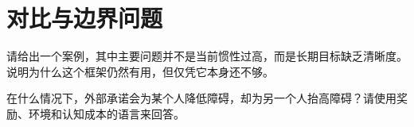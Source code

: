 \section{对比与边界问题}

\begin{exercisebox}
\begin{exercise}
请给出一个案例，其中主要问题并不是当前惯性过高，而是长期目标缺乏清晰度。说明为什么这个框架仍然有用，但仅凭它本身还不够。
\end{exercise}

\begin{exercise}
在什么情况下，外部承诺会为某个人降低障碍，却为另一个人抬高障碍？请使用奖励、环境和认知成本的语言来回答。
\end{exercise}
\end{exercisebox}
